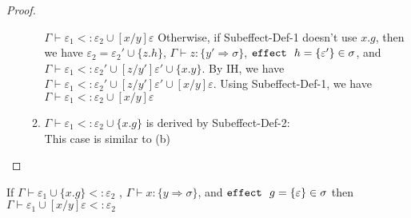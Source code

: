 \begin{proof}
\begin{enumerate}
\begin{enumerate}
        $\Gamma \vdash \varepsilon_1 <: \varepsilon_2 \cup [x/y]\varepsilon$
        Otherwise, if Subeffect-Def-1 doesn't use $x.g$, then we have 
        \mbox{$\varepsilon_2 = \varepsilon_2' \cup \{z.h\}$},
        \mbox{$\Gamma \vdash z : \{y' \Rightarrow\sigma\}$},
        \mbox{$\mathtt{effect}~\ h = \{ \varepsilon'\} \in \sigma$},
        and 
        \mbox{$\Gamma \vdash \varepsilon_1  <: \varepsilon_2' \cup [z/y']\varepsilon' \cup \{x.y\}$}.
        By IH, we have
        \mbox{$\Gamma \vdash \varepsilon_1  <: \varepsilon_2' \cup [z/y']\varepsilon' \cup [x/y]\varepsilon$}.
        Using Subeffect-Def-1, we have
        \mbox{$\Gamma \vdash \varepsilon_1<: \varepsilon_2 \cup [x/y]\varepsilon$}
        \item \mbox{$\Gamma \vdash \varepsilon_1  <: \varepsilon_2 \cup \{x.g\}$} is derived by Subeffect-Def-2:\\ This case is similar to (b)
    \end{enumerate}
\end{enumerate}
\end{proof}



\begin{lemma} \label{lemma-reverse2}
If $\Gamma \vdash \varepsilon_1 \cup \{x.g\} <: \varepsilon_2$
, $\Gamma \vdash x : \{y \Rightarrow \sigma\}$, and
$\mathtt{effect}~\ g = \{\varepsilon\} \in \sigma$
then 
$\Gamma \vdash \varepsilon_1 \cup [x/y]\varepsilon <: \varepsilon_2$
\end{lemma}

